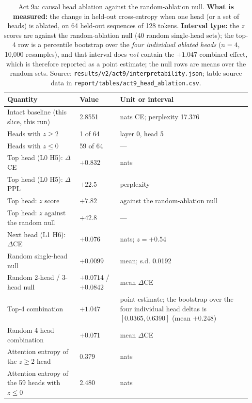 \documentclass[11pt,a4paper]{article}
\begin{document}
\begin{table}[H]
\centering
\begin{tabular}{L{6.6cm}R{2.4cm}R{2.6cm}}
\toprule
Quantity & Value & Unit or interval \\
\midrule
Intact baseline (this slice, this run) & 2.8551 & nats CE; perplexity 17.376 \\
Heads with $z \geq 2$ & 1 of 64 & layer 0, head 5 \\
Heads with $z \leq 0$ & 59 of 64 & --- \\
Top head (L0 H5): $\Delta$CE & $+0.832$ & nats \\
Top head (L0 H5): $\Delta$PPL & $+22.5$ & perplexity \\
Top head: $z$ score & $+7.82$ & against the random-ablation null \\
Top head: $z$ against the random null & $+42.8$ & --- \\
Next head (L1 H6): $\Delta$CE & $+0.076$ & nats; $z = +0.54$ \\
Random single-head null & $+0.0099$ & mean; s.d. 0.0192 \\
Random 2-head / 3-head null & $+0.0714$ / $+0.0842$ & mean $\Delta$CE \\
Top-4 combination & $+1.047$ & point estimate; the bootstrap over the four individual head deltas is $[0.0365, 0.6390]$ (mean $+0.248$) \\
Random 4-head combination & $+0.071$ & mean $\Delta$CE \\
Attention entropy of the $z \geq 2$ head & 0.379 & nats \\
Attention entropy of the 59 heads with $z \leq 0$ & 2.480 & nats \\
\bottomrule
\end{tabular}
\caption{Act 9a: causal head ablation against the random-ablation null.
\textbf{What is measured:} the change in held-out cross-entropy when one head
(or a set of heads) is ablated, on 64 held-out sequences of 128 tokens.
\textbf{Interval type:} the $z$ scores are against the random-ablation null
(40 random single-head sets); the top-4 row is a percentile bootstrap over the
\emph{four individual ablated heads} ($n = 4$, 10,000 resamples), and that
interval does \emph{not} contain the $+1.047$ combined effect, which is
therefore reported as a point estimate; the null rows are means over the
random sets. Source: \texttt{results/v2/act9/interpretability.json}; table
source data in \texttt{report/tables/act9\_head\_ablation.csv}.}
\label{tab:act9a}
\end{table}
\end{document}
